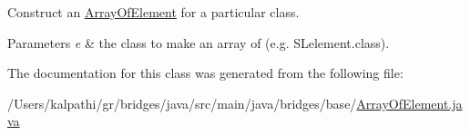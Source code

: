 Construct an \mbox{\hyperlink{classbridges_1_1base_1_1_array_of_element}{Array\+Of\+Element}} for a particular class. 
\begin{DoxyParams}{Parameters}
{\em e} & the class to make an array of (e.\+g. S\+Lelement.\+class). \\
\hline
\end{DoxyParams}


The documentation for this class was generated from the following file\+:\begin{DoxyCompactItemize}
\item 
/\+Users/kalpathi/gr/bridges/java/src/main/java/bridges/base/\mbox{\hyperlink{_array_of_element_8java}{Array\+Of\+Element.\+java}}\end{DoxyCompactItemize}
